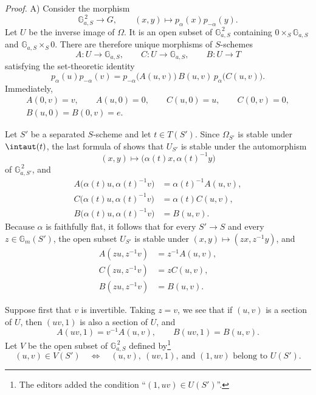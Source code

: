 \medskip
\noindent\emph{Proof.}
\textup{A)} Consider the morphism
\[
  \mathbb G_{a,S}^{\,2}\longrightarrow G,\qquad
  (x,y)\longmapsto p_\alpha(x)p_{-\alpha}(y).
\]
Let \(U\) be the inverse image of \(\Omega\). It is an open subset
of \(\mathbb G_{a,S}^{\,2}\) containing
\(0\times_S\mathbb G_{a,S}\) and
\(\mathbb G_{a,S}\times_S0\). There are therefore unique
morphisms of \(S\)-schemes
\[
  A\colon U\longrightarrow\mathbb G_{a,S},\qquad
  C\colon U\longrightarrow\mathbb G_{a,S},\qquad
  B\colon U\longrightarrow T
\]
satisfying the set-theoretic identity
\[
  p_\alpha(u)p_{-\alpha}(v)
    =p_{-\alpha}\bigl(A(u,v)\bigr)\,
      B(u,v)\,p_\alpha\bigl(C(u,v)\bigr).
\]
Immediately,
\[
\begin{gathered}
  A(0,v)=v,\qquad A(u,0)=0,\qquad
  C(u,0)=u,\qquad C(0,v)=0,\\
  B(u,0)=B(0,v)=e.
\end{gathered}
\]

Let \(S'\) be a separated \(S\)-scheme and let \(t\in T(S')\).
Since \(\Omega_{S'}\) is stable under \(\intaut(t)\), the last
formula of  shows that \(U_{S'}\) is stable under the
automorphism
\[
  (x,y)\longmapsto
    \bigl(\alpha(t)x,\alpha(t)^{-1}y\bigr)
\]
of \(\mathbb G_{a,S'}^{\,2}\), and
\[
\begin{aligned}
 A\bigl(\alpha(t)u,\alpha(t)^{-1}v\bigr)
   &=\alpha(t)^{-1}A(u,v),\\
 C\bigl(\alpha(t)u,\alpha(t)^{-1}v\bigr)
   &=\alpha(t)C(u,v),\\
 B\bigl(\alpha(t)u,\alpha(t)^{-1}v\bigr)
   &=B(u,v).
\end{aligned}
\]
Because \(\alpha\) is faithfully flat, it follows that for every
\(S'\to S\) and every \(z\in\mathbb G_m(S')\), the open subset
\(U_{S'}\) is stable under
\((x,y)\mapsto(zx,z^{-1}y)\), and
\[
\begin{aligned}
  A(zu,z^{-1}v)&=z^{-1}A(u,v),\\
  C(zu,z^{-1}v)&=zC(u,v),\\
  B(zu,z^{-1}v)&=B(u,v).
\end{aligned}
\]

Suppose first that \(v\) is invertible. Taking \(z=v\), we see
that if \((u,v)\) is a section of \(U\), then \((uv,1)\) is also
a section of \(U\), and
\[
  A(uv,1)=v^{-1}A(u,v),\qquad
  B(uv,1)=B(u,v).
\]
Let \(V\) be the open subset of \(\mathbb G_{a,S}^{\,2}\) defined
by\footnote{The editors added the condition
``\((1,uv)\in U(S')\)''.}
\[
  (u,v)\in V(S')
  \quad\Longleftrightarrow\quad
  (u,v),\ (uv,1),\ \text{and }(1,uv)\text{ belong to }U(S').
\]

